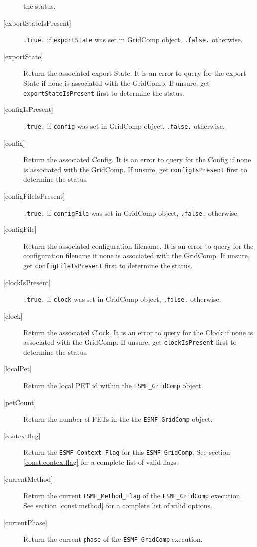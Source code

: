 \begin{description}
     the status.
   \item[{[exportStateIsPresent]}]
     {\tt .true.} if {\tt exportState} was set in GridComp object,
     {\tt .false.} otherwise.
   \item[{[exportState]}]
     Return the associated export State.
     It is an error to query for the export State if none is associated with
     the GridComp. If unsure, get {\tt exportStateIsPresent} first to determine
     the status.
   \item[{[configIsPresent]}]
     {\tt .true.} if {\tt config} was set in GridComp object,
     {\tt .false.} otherwise.
   \item[{[config]}]
     Return the associated Config.
     It is an error to query for the Config if none is associated with
     the GridComp. If unsure, get {\tt configIsPresent} first to determine
     the status.
   \item[{[configFileIsPresent]}]
     {\tt .true.} if {\tt configFile} was set in GridComp object,
     {\tt .false.} otherwise.
   \item[{[configFile]}]
     Return the associated configuration filename.
     It is an error to query for the configuration filename if none is associated with
     the GridComp. If unsure, get {\tt configFileIsPresent} first to determine
     the status.
   \item[{[clockIsPresent]}]
     {\tt .true.} if {\tt clock} was set in GridComp object,
     {\tt .false.} otherwise.
   \item[{[clock]}]
     Return the associated Clock.
     It is an error to query for the Clock if none is associated with
     the GridComp. If unsure, get {\tt clockIsPresent} first to determine
     the status.
   \item[{[localPet]}]
     Return the local PET id within the {\tt ESMF\_GridComp} object.
   \item[{[petCount]}]
     Return the number of PETs in the the {\tt ESMF\_GridComp} object.
   \item[{[contextflag]}]
     Return the {\tt ESMF\_Context\_Flag} for this {\tt ESMF\_GridComp}.
     See section \ref{const:contextflag} for a complete list of valid flags.
   \item[{[currentMethod]}]
     Return the current {\tt ESMF\_Method\_Flag} of the {\tt ESMF\_GridComp}
     execution. See section \ref{const:method}  for a complete list of valid
     options.
   \item[{[currentPhase]}]
     Return the current {\tt phase} of the {\tt ESMF\_GridComp} execution.

\end{description}
